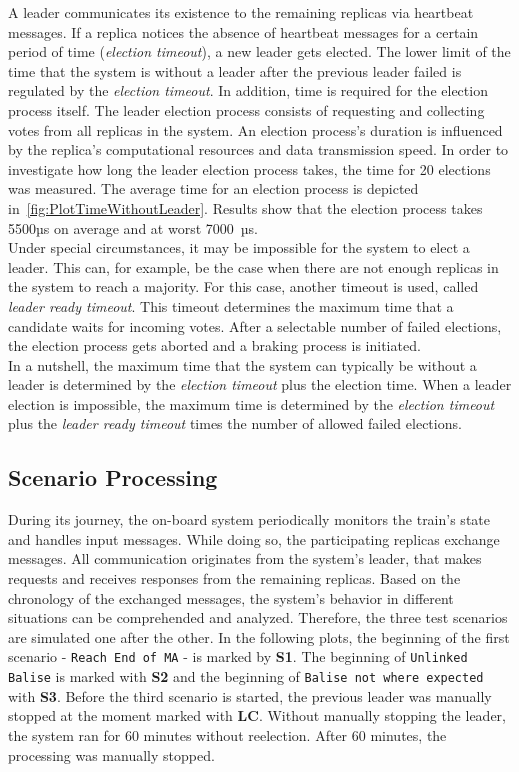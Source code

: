 A leader communicates its existence to the remaining replicas via heartbeat messages.
If a replica notices the absence of heartbeat messages for a certain period of time (\textit{election timeout}), a new leader gets elected.
The lower limit of the time that the system is without a leader after the previous leader failed is regulated by the \textit{election timeout}.
In addition, time is required for the election process itself.
The leader election process consists of requesting and collecting votes from all replicas in the system.
An election process's duration is influenced by the replica's computational resources and data transmission speed.
In order to investigate how long the leader election process takes, the time for 20 elections was measured.
The average time for an election process is depicted in~\autoref{fig:PlotTimeWithoutLeader}.
Results show that the election process takes 5500µs on average and at worst 7000~µs.
\\

Under special circumstances, it may be impossible for the system to elect a leader.
This can, for example, be the case when there are not enough replicas in the system to reach a majority.
For this case, another timeout is used, called \textit{leader ready timeout}.
This timeout determines the maximum time that a candidate waits for incoming votes.
After a selectable number of failed elections, the election process gets aborted and a braking process is initiated.
\\

In a nutshell, the maximum time that the system can typically be without a leader is determined by the \textit{election timeout} plus the election time.
When a leader election is impossible, the maximum time is determined by the \textit{election timeout} plus the \textit{leader ready timeout} times the number of allowed failed elections.

\subsection{Scenario Processing}

During its journey, the on-board system periodically monitors the train's state and handles input messages.
While doing so, the participating replicas exchange messages.
All communication originates from the system's leader, that makes requests and receives responses from the remaining replicas.
Based on the chronology of the exchanged messages, the system's behavior in different situations can be comprehended and analyzed.
Therefore, the three test scenarios are simulated one after the other.
In the following plots, the beginning of the first scenario - \texttt{Reach End of MA} - is marked by \textbf{S1}.
The beginning of \texttt{Unlinked Balise} is marked with \textbf{S2} and the beginning of \texttt{Balise not where expected} with \textbf{S3}.
Before the third scenario is started, the previous leader was manually stopped at the moment marked with \textbf{LC}.
Without manually stopping the leader, the system ran for 60 minutes without reelection.
After 60 minutes, the processing was manually stopped.

